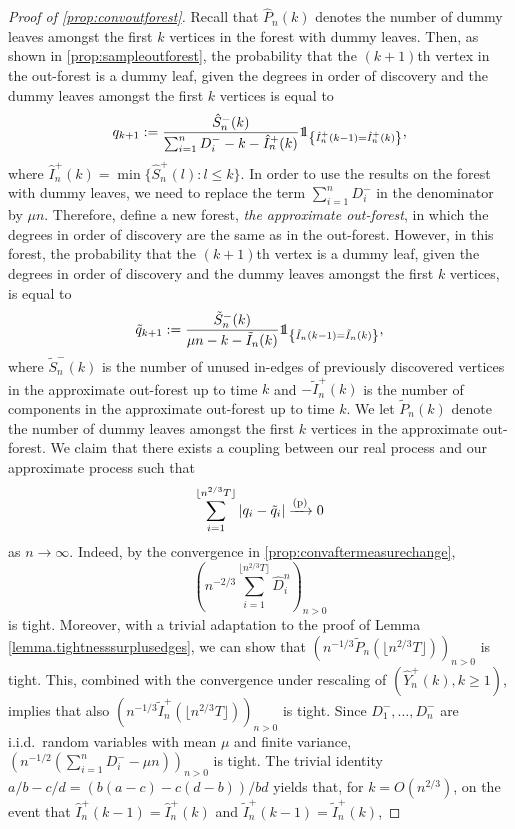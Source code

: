 \begin{proof}[Proof of \cref{prop:convoutforest}]
Recall that $\hat{P}_n(k)$ denotes the number of dummy leaves amongst the first $k$ vertices in the forest with dummy leaves. Then, as shown in \cref{prop:sampleoutforest}, the probability that the $(k+1)$th vertex in the out-forest is a dummy leaf, given the degrees in order of discovery and the dummy leaves amongst the first $k$ vertices is equal to
$$q_{k+1}:=\frac{\hat{S}^-_n(k)}{\sum_{i=1}^n D^-_i-k-\hat{I}^+_n(k)}\one_{\left\{\hat{I}^+_n(k-1)= \hat{I}^+_n(k)\right\}},$$
where $\hat{I}^+_n(k)=\min\{\hat{S}^{+}_n(l):l\leq k\}$.
In order to use the results on the forest with dummy leaves, we need to replace the term $\sum_{i=1}^n D^-_i$ in the denominator by $\mu n$. Therefore, define a new forest, \emph{the approximate out-forest}, in which the degrees in order of discovery are the same as in the out-forest. However, in this forest, the probability that the $(k+1)$th vertex is a dummy leaf, given the degrees in order of discovery and the dummy leaves amongst the first $k$ vertices, is equal to
$$\tilde{q}_{k+1}:=\frac{\tilde{S}^-_n(k)}{\mu n-k-\tilde{I}_n(k)}\one_{\left\{\tilde{I}_n(k-1)=\tilde{I}_n(k)\right\}},$$
where $\tilde{S}^-_n(k)$ is the number of unused in-edges of previously discovered vertices in the approximate out-forest up to time $k$ and $-\tilde{I}^+_n(k)$ is the number of components in the approximate out-forest up to time $k$. We let $\tilde{P}_n(k)$ denote the number of dummy leaves amongst the first $k$ vertices in the approximate out-forest. 
We claim that there exists a coupling between our real process  and our approximate process such that
$$\sum_{i=1}^{\lfloor n^{2/3}T\rfloor }|q_i-\tilde{q}_i|\xrightarrow[]{\mathrm{(p)}}0$$
as $n\to \infty$. 
Indeed, by the convergence in \cref{prop:convaftermeasurechange}, 
$$\left(n^{-2/3}\sum_{i=1}^{\lfloor n^{2/3}T\rfloor} \hat{D}^n_i\right)_{n>0}$$ is tight. Moreover, with a trivial adaptation to the proof of Lemma \ref{lemma.tightnesssurplusedges}, we can show that $\left(n^{-1/3}\tilde{P}_n\left(\lfloor n^{2/3}T\rfloor \right)\right)_{n>0}$ is tight. This, combined with the convergence under rescaling of $(\hat{Y}^+_n(k),k\geq 1)$, implies that also $\left(n^{-1/3}\tilde{I}^+_n\left(\lfloor n^{2/3}T\rfloor \right)\right)_{n>0}$ is tight.  Since $D^-_1,\dots,D^-_n$ are i.i.d.\ random variables with mean $\mu$ and finite variance,
$\left(n^{-1/2}\left(\sum_{i=1}^{n}D^-_i-\mu n\right)\right)_{n>0}$ is tight. The trivial identity $a/b-c/d=(b(a-c)-c(d-b))/bd$ yields that, for $k=O(n^{2/3})$, on the event that $\hat{I}^+_n(k-1)= \hat{I}^+_n(k)$ and $\tilde{I}^+_n(k-1)= \tilde{I}^+_n(k)$, 

\end{proof}
